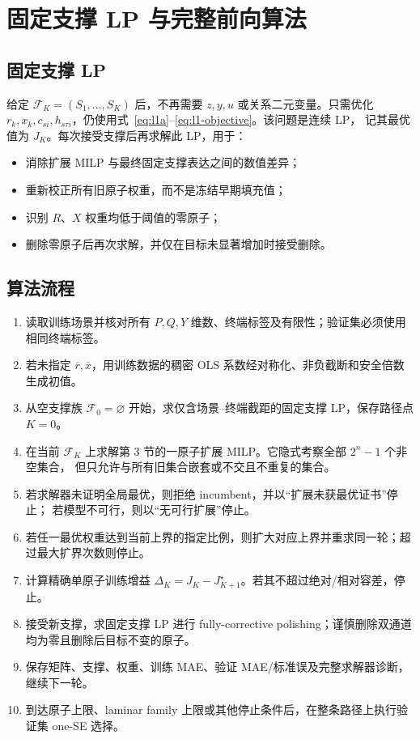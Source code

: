 \documentclass[UTF8,11pt]{ctexart}
\begin{document}
\section{固定支撑 LP 与完整前向算法}

\subsection{固定支撑 LP}

给定 $\mathcal F_K=(S_1,\ldots,S_K)$ 后，不再需要 $z,y,u$ 或关系二元变量。只需优化
$r_k,x_k,c_{si},h_{s\tau i}$，仍使用式~\eqref{eq:l1a}--\eqref{eq:l1-objective}。该问题是连续 LP，
记其最优值为 $J_K$。每次接受支撑后再求解此 LP，用于：
\begin{itemize}
  \item 消除扩展 MILP 与最终固定支撑表达之间的数值差异；
  \item 重新校正所有旧原子权重，而不是冻结早期填充值；
  \item 识别 $R$、$X$ 权重均低于阈值的零原子；
  \item 删除零原子后再次求解，并仅在目标未显著增加时接受删除。
\end{itemize}

\subsection{算法流程}

\begin{enumerate}[label=\textbf{步骤 \arabic*.},leftmargin=4.2em]
  \item 读取训练场景并核对所有 $P,Q,Y$ 维数、终端标签及有限性；验证集必须使用相同终端标签。
  \item 若未指定 $\overline r,\overline x$，用训练数据的稠密 OLS 系数经对称化、非负截断和安全倍数生成初值。
  \item 从空支撑族 $\mathcal F_0=\varnothing$ 开始，求仅含场景--终端截距的固定支撑 LP，保存路径点 $K=0$。
  \item 在当前 $\mathcal F_K$ 上求解第 3 节的一原子扩展 MILP。它隐式考察全部 $2^n-1$ 个非空集合，
  但只允许与所有旧集合嵌套或不交且不重复的集合。
  \item 若求解器未证明全局最优，则拒绝 incumbent，并以“扩展未获最优证书”停止；
  若模型不可行，则以“无可行扩展”停止。
  \item 若任一最优权重达到当前上界的指定比例，则扩大对应上界并重求同一轮；超过最大扩界次数则停止。
  \item 计算精确单原子训练增益 $\Delta_K=J_K-J_{K+1}^{\star}$。若其不超过绝对/相对容差，停止。
  \item 接受新支撑，求固定支撑 LP 进行 fully-corrective polishing；谨慎删除双通道均为零且删除后目标不变的原子。
  \item 保存矩阵、支撑、权重、训练 MAE、验证 MAE/标准误及完整求解器诊断，继续下一轮。
  \item 到达原子上限、laminar family 上限或其他停止条件后，在整条路径上执行验证集 one-SE 选择。
\end{enumerate}
\end{document}
